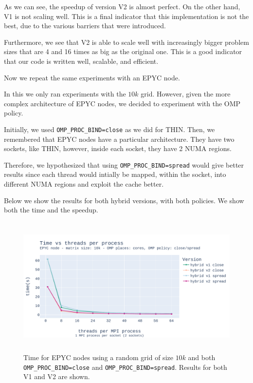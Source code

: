 \documentclass{report}
\begin{document}
As we can see, the speedup of version V2 is almost perfect. On the other hand, 
V1 is not scaling well. This is a final indicator that this implementation is not 
the best, due to the various barriers that were introduced. 

Furthermore, we see that V2 is able to scale well with increasingly bigger 
problem sizes that are 4 and 16 times as big as the original one. 
This is a good indicator that our code is written well, scalable, and efficient.   

Now we repeat the same experiments with an EPYC node.

In this we only ran experiments with the $10k$ grid. However, given the more 
complex architecture of EPYC nodes, we decided to experiment with the OMP policy.

Initially, we used \texttt{OMP\_PROC\_BIND=close} as we did for THIN. Then, we 
remembered that EPYC nodes have a particular architecture. They have two 
sockets, like THIN, however, inside each socket, they have 2 NUMA regions. 

Therefore, we hypothesized that using \texttt{OMP\_PROC\_BIND=spread} 
would give better results since each thread would intially be mapped, within the 
socket, into different NUMA regions and exploit the cache better.

Below we show the results for both hybrid versions, with both policies. We show 
both the time and the speedup.

\begin{figure}[H]
\centering
\includegraphics[width=14cm, height=7cm]{./images/strong_OMP_epyc_hybrid_grid_010k.pdf}
\caption{\label{fig:strongomp10kepyc} Time for EPYC nodes using a random grid of size 
$10k$ and both \texttt{OMP\_PROC\_BIND=close} and \texttt{OMP\_PROC\_BIND=spread}. 
Results for both V1 and V2 are shown.}
\end{figure}
\end{document}
